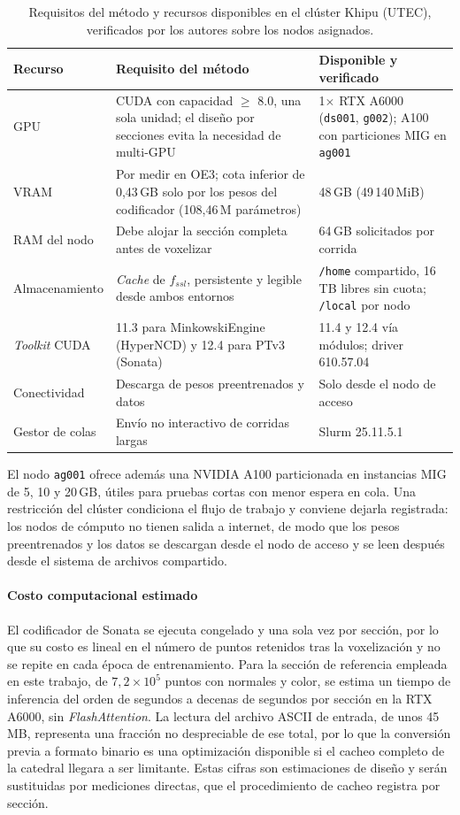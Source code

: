 \begin{table}[H]
\centering
\caption{Requisitos del método y recursos disponibles en el clúster Khipu (UTEC),
verificados por los autores sobre los nodos asignados.}
\label{tab:hardware}
\begin{tabular}{@{}p{2.9cm}p{4.6cm}p{4.5cm}@{}}
\toprule
\textbf{Recurso} & \textbf{Requisito del método} & \textbf{Disponible y verificado} \\
\midrule
GPU & CUDA con capacidad $\geq$ 8.0, una sola unidad; el diseño por secciones evita la necesidad de multi-GPU & 1$\times$ RTX A6000 (\texttt{ds001}, \texttt{g002}); A100 con particiones MIG en \texttt{ag001} \\
VRAM & Por medir en OE3; cota inferior de 0{,}43\,GB solo por los pesos del codificador (108{,}46\,M parámetros) & 48\,GB (49\,140\,MiB) \\
RAM del nodo & Debe alojar la sección completa antes de voxelizar & 64\,GB solicitados por corrida \\
Almacenamiento & \emph{Cache} de $f_{ssl}$, persistente y legible desde ambos entornos & \texttt{/home} compartido, 16\,TB libres sin cuota; \texttt{/local} por nodo \\
\emph{Toolkit} CUDA & 11.3 para MinkowskiEngine (HyperNCD) y 12.4 para PTv3 (Sonata) & 11.4 y 12.4 vía módulos; driver 610.57.04 \\
Conectividad & Descarga de pesos preentrenados y datos & Solo desde el nodo de acceso \\
Gestor de colas & Envío no interactivo de corridas largas & Slurm 25.11.5.1 \\
\bottomrule
\end{tabular}
\end{table}

El nodo \texttt{ag001} ofrece además una NVIDIA A100 particionada en instancias
MIG de 5, 10 y 20\,GB, útiles para pruebas cortas con menor espera en cola. Una
restricción del clúster condiciona el flujo de trabajo y conviene dejarla
registrada: los nodos de cómputo no tienen salida a internet, de modo que los
pesos preentrenados y los datos se descargan desde el nodo de acceso y se leen
después desde el sistema de archivos compartido.

\paragraph*{Costo computacional estimado}
El codificador de Sonata se ejecuta congelado y una sola vez por sección, por lo
que su costo es lineal en el número de puntos retenidos tras la voxelización y no
se repite en cada época de entrenamiento. Para la sección de referencia empleada
en este trabajo, de $7{,}2\times10^{5}$ puntos con normales y color, se estima un
tiempo de inferencia del orden de segundos a decenas de segundos por sección en
la RTX A6000, sin \emph{FlashAttention}. La lectura del archivo ASCII de entrada,
de unos 45\,MB, representa una fracción no despreciable de ese total, por lo que
la conversión previa a formato binario es una optimización disponible si el
cacheo completo de la catedral llegara a ser limitante. Estas cifras son
estimaciones de diseño y serán sustituidas por mediciones directas, que el
procedimiento de cacheo registra por sección.

